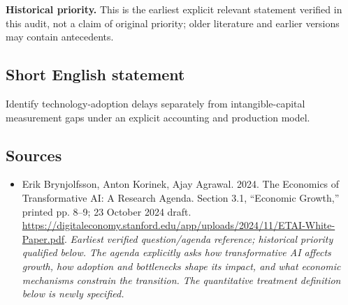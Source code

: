 \documentclass[11pt]{article}
\begin{document}
\par\textbf{Historical priority.} This is the earliest explicit relevant statement verified in this audit, not a claim of original priority; older literature and earlier versions may contain antecedents.

\subsection{Short English statement}
Identify technology-adoption delays separately from intangible-capital measurement gaps under an explicit accounting and production model.

\subsection{Sources}
\begin{itemize}\raggedright
\item[\textnormal{[S1]}]\hypertarget{source:30007545:1}{} Erik Brynjolfsson, Anton Korinek, Ajay Agrawal. 2024. The Economics of Transformative AI: A Research Agenda. Section 3.1, “Economic Growth,” printed pp. 8–9; 23 October 2024 draft.
\url{https://digitaleconomy.stanford.edu/app/uploads/2024/11/ETAI-White-Paper.pdf}.
{\small\textit{Earliest verified question/agenda reference; historical priority qualified below. The agenda explicitly asks how transformative AI affects growth, how adoption and bottlenecks shape its impact, and what economic mechanisms constrain the transition. The quantitative treatment definition below is newly specified.}}
\end{itemize}
\end{document}
